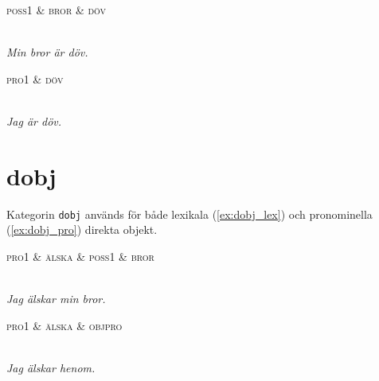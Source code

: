 \documentclass[11pt,a4paper]{article}
\begin{document}
\begin{example}
\label{ex:nsubj_lex}
\begin{dependency}[theme = simple]
   \begin{deptext}[column sep=1em]
      \textsc{poss1} \& \textsc{bror} \& \textsc{döv} \\
   \end{deptext}
\end{dependency}
\\
\textit{Min bror är döv.}
\end{example}

\begin{example}
\label{ex:nsubj_pro}
\begin{dependency}[theme = simple]
   \begin{deptext}[column sep=1em]
      \textsc{pro1} \& \textsc{döv} \\
   \end{deptext}
\end{dependency}
\\
\textit{Jag är döv.}
\end{example}


\section{dobj}
Kategorin \texttt{dobj} används för både lexikala (\ref{ex:dobj_lex}) och pronominella (\ref{ex:dobj_pro}) direkta objekt.

\begin{example}
\label{ex:dobj_lex}
\begin{dependency}[theme = simple]
   \begin{deptext}[column sep=1em]
      \textsc{pro1} \& \textsc{älska} \& \textsc{poss1} \& \textsc{bror} \\
   \end{deptext}
\end{dependency}
\\
\textit{Jag älskar min bror.}
\end{example}

\begin{example}
\label{ex:dobj_pro}
\begin{dependency}[theme = simple]
   \begin{deptext}[column sep=1em]
      \textsc{pro1} \& \textsc{älska} \& \textsc{objpro} \\
   \end{deptext}
\end{dependency}
\\
\textit{Jag älskar henom.}
\end{example}
\end{document}
